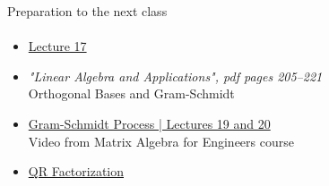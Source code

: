 \documentclass[aspectratio=169]{beamer}
\newcommand{\fbckg}[1]{\usebackgroundtemplate{\texttt{[image: \#1]}}}%
\begin{document}
\begin{frame}[t]{Preparation to the next class}
    \framesubtitle{}
    \Large
    \begin{itemize}
        \item \href{https://www.youtube.com/watch?v=Y_Ac6KiQ1t0&list=PL49CF3715CB9EF31D&index=17}{Lecture 17}
        \item \textit{"Linear Algebra and Applications", pdf pages 205--221 }\\ Orthogonal Bases and Gram-Schmidt
        \item \href{https://www.youtube.com/watch?v=eib8uAlzegc&list=PLkZjai-2Jcxlg-Z1roB0pUwFU-P58tvOx&index=20}{Gram-Schmidt Process | Lectures 19 and 20}\\ Video from Matrix Algebra for Engineers course
        \item \href{https://www.youtube.com/watch?v=J41Ypt6Mftc}{QR Factorization}
    \end{itemize}
\end{frame}

\usebackgroundtemplate{}
% 

\fbckg{fibeamer/figs/last_page.png}
\frame[plain]{}
\end{document}
